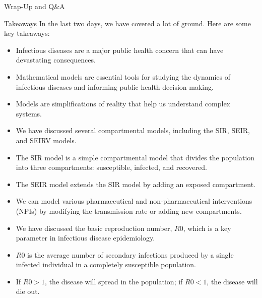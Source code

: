 \documentclass[
  ignorenonframetext,
]{beamer}
\begin{document}
\begin{frame}{Wrap-Up and Q\&A}
\label{wrap-up-and-qa}
\begin{block}{Takeaways}
\label{takeaways}
In the last two days, we have covered a lot of ground. Here are some key
takeaways:

\begin{itemize}
\item
  Infectious diseases are a major public health concern that can have
  devastating consequences.
\item
  Mathematical models are essential tools for studying the dynamics of
  infectious diseases and informing public health decision-making.
\item
  Models are simplifications of reality that help us understand complex
  systems.
\end{itemize}
\end{block}
\end{frame}

\begin{frame}
\begin{itemize}
\item
  We have discussed several compartmental models, including the SIR,
  SEIR, and SEIRV models.
\item
  The SIR model is a simple compartmental model that divides the
  population into three compartments: susceptible, infected, and
  recovered.
\item
  The SEIR model extends the SIR model by adding an exposed compartment.
\item
  We can model various pharmaceutical and non-pharmaceutical
  interventions (NPIs) by modifying the transmission rate or adding new
  compartments.
\end{itemize}
\end{frame}

\begin{frame}
\begin{itemize}
\item
  We have discussed the basic reproduction number, \(R0\), which is a
  key parameter in infectious disease epidemiology.
\item
  \(R0\) is the average number of secondary infections produced by a
  single infected individual in a completely susceptible population.
\item
  If \(R0 > 1\), the disease will spread in the population; if
  \(R0 < 1\), the disease will die out.
\end{itemize}
\end{frame}
\end{document}
